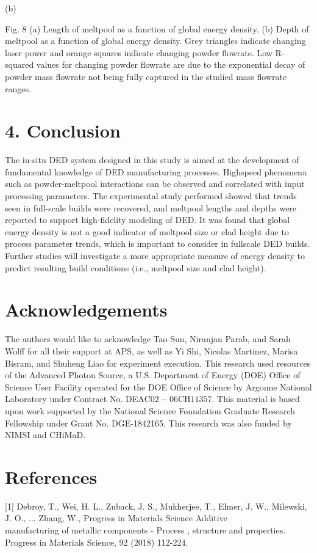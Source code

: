 \documentclass[10pt]{article}
\begin{document}
(b)

Fig. 8 (a) Length of meltpool as a function of global energy density. (b) Depth of meltpool as a function of global energy density. Grey triangles indicate changing laser power and orange squares indicate changing powder flowrate. Low R-squared values for changing powder flowrate are due to the exponential decay of powder mass flowrate not being fully captured in the studied mass flowrate ranges.

\section*{4. Conclusion}
The in-situ DED system designed in this study is aimed at the development of fundamental knowledge of DED manufacturing processes. Highspeed phenomena such as powder-meltpool interactions can be observed and correlated with input processing parameters. The experimental study performed showed that trends seen in full-scale builds were recovered, and meltpool lengths and depths were reported to support high-fidelity modeling of DED. It was found that global energy density is not a good indicator of meltpool size or clad height due to process parameter trends, which is important to consider in fullscale DED builds. Further studies will investigate a more appropriate measure of energy density to predict resulting build conditions (i.e., meltpool size and clad height).

\section*{Acknowledgements}
The authors would like to acknowledge Tao Sun, Niranjan Parab, and Sarah Wolff for all their support at APS, as well as Yi Shi, Nicolas Martinez, Marisa Bisram, and Shuheng Liao for experiment execution. This research used resources of the Advanced Photon Source, a U.S. Department of Energy (DOE) Office of Science User Facility operated for the DOE Office of Science by Argonne National Laboratory under Contract No. DE$\mathrm{AC02-06CH11357}$. This material is based upon work supported by the National Science Foundation Graduate Research Fellowship under Grant No. DGE-1842165. This research was also funded by NIMSI and CHiMaD.

\section*{References}
[1] Debroy, T., Wei, H. L., Zuback, J. S., Mukherjee, T., Elmer, J. W., Milewski, J. O., ... Zhang, W., Progress in Materials Science Additive\\
manufacturing of metallic components - Process , structure and properties. Progress in Materials Science, 92 (2018) 112-224.
\end{document}
